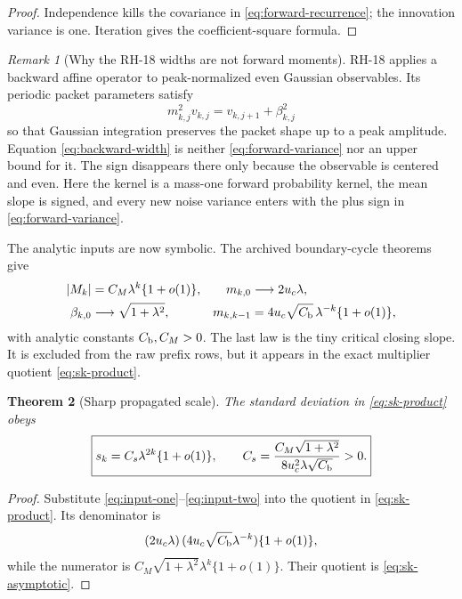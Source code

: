 \documentclass[11pt]{article}
\newtheorem{theorem}{Theorem}[section]
\theoremstyle{definition}
\theoremstyle{remark}
\newtheorem{remark}[theorem]{Remark}
\begin{document}
\begin{proof}
Independence kills the covariance in \eqref{eq:forward-recurrence}; the
innovation variance is one.  Iteration gives the coefficient-square formula.
\end{proof}

\begin{remark}[Why the RH-18 widths are not forward moments]
RH-18 applies a backward affine operator to peak-normalized even Gaussian
observables.  Its periodic packet parameters satisfy
\begin{equation}\label{eq:backward-width}
 m_{k,j}^2v_{k,j}=v_{k,j+1}+\beta_{k,j}^2
\end{equation}
so that Gaussian integration preserves the packet shape up to a peak
amplitude.  Equation \eqref{eq:backward-width} is neither
\eqref{eq:forward-variance} nor an upper bound for it.  The sign disappears
there only because the observable is centered and even.  Here the kernel is
a mass-one forward probability kernel, the mean slope is signed, and every
new noise variance enters with the plus sign in
\eqref{eq:forward-variance}.
\end{remark}

The analytic inputs are now symbolic.  The archived boundary-cycle theorems
give
\begin{align}
 |M_k|&=C_M\lambda^k\{1+o(1)\},
 &m_{k,0}&\longrightarrow2u_c\lambda,
 \label{eq:input-one}\\
 \beta_{k,0}&\longrightarrow\sqrt{1+\lambda^2},
 &m_{k,k-1}
 &=4u_c\sqrt{C_{\rm b}}\,\lambda^{-k}\{1+o(1)\},
 \label{eq:input-two}
\end{align}
with analytic constants $C_{\rm b},C_M>0$.  The last law is the tiny
critical closing slope.  It is excluded from the raw prefix rows, but it
appears in the exact multiplier quotient \eqref{eq:sk-product}.

\begin{theorem}[Sharp propagated scale]\label{thm:propagated-scale}
The standard deviation in \eqref{eq:sk-product} obeys
\begin{equation}\label{eq:sk-asymptotic}
 \boxed{
 s_k=C_s\lambda^{2k}\{1+o(1)\},
 \qquad
 C_s=
 \frac{C_M\sqrt{1+\lambda^2}}
 {8u_c^2\lambda\sqrt{C_{\rm b}}}>0.}
\end{equation}
\end{theorem}

\begin{proof}
Substitute \eqref{eq:input-one}--\eqref{eq:input-two} into the quotient in
\eqref{eq:sk-product}.  Its denominator is
\[
 (2u_c\lambda)\,
 (4u_c\sqrt{C_{\rm b}}\lambda^{-k})\{1+o(1)\},
\]
while the numerator is
$C_M\sqrt{1+\lambda^2}\lambda^k\{1+o(1)\}$.
Their quotient is \eqref{eq:sk-asymptotic}.
\end{proof}
\end{document}
